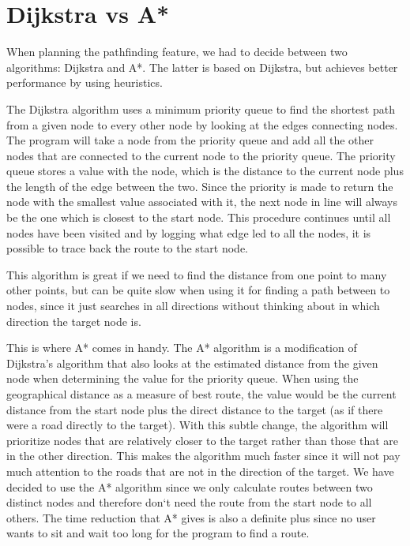 \section{Dijkstra vs A*}
\label{IMPL-DVA}
When planning the pathfinding feature, we had to decide between two algorithms: 
Dijkstra and A*. The latter is based on Dijkstra, but achieves better performance by 
using heuristics.

The Dijkstra algorithm uses a minimum priority queue to find the shortest path 
from a given node to every other node by looking at the edges connecting nodes. 
The program will take a node from the priority queue and add all the other nodes 
that are connected to the current node to the priority queue. The priority queue 
stores a value with the node, which is the distance to the current node 
plus the length of the edge between the two. Since the priority is made to return 
the node with the smallest value associated with it, the next node in line will 
always be the one which is closest to the start node. This procedure continues 
until all nodes have been visited and by logging what edge led to all the nodes, 
it is possible to trace back the route to the start node.

This algorithm is great if we need to find the distance from one point to many other 
points, but can be quite slow when using it for finding a path between to nodes, 
since it just searches in all directions without thinking about in which direction the 
target node is.

This is where A* comes in handy. The A* algorithm is a modification of Dijkstra's 
algorithm that also looks at the estimated distance from the given node when 
determining the value for the priority queue. When using the geographical distance 
as a measure of best route, the value would be the current distance from the start 
node plus the direct distance to the target (as if there were a road directly to 
the target). With this subtle change, the algorithm will prioritize nodes that are 
relatively closer to the target rather than those that are in the other
direction. This makes the algorithm much faster since it will not pay much attention 
to the roads that are not in the direction of the target.
We have decided to use the A* algorithm since we only calculate routes between 
two distinct nodes and therefore don`t need the route from the start node to all 
others. The time reduction that A* gives is also a definite plus since no user 
wants to sit and wait too long for the program to find a route.

